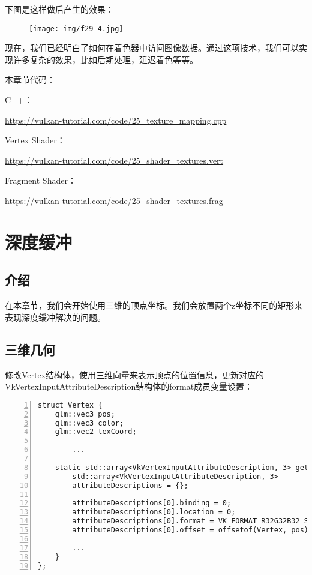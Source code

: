 \documentclass{ctexart}
\begin{document}
下图是这样做后产生的效果：

\begin{figure}[H]
	\centering
	\texttt{[image: img/f29-4.jpg]}
\end{figure}

现在，我们已经明白了如何在着色器中访问图像数据。通过这项技术，我们可以实现许多复杂的效果，比如后期处理，延迟着色等等。

本章节代码：

C++：

\url{https://vulkan-tutorial.com/code/25_texture_mapping.cpp}

Vertex Shader：

\url{https://vulkan-tutorial.com/code/25_shader_textures.vert}

Fragment Shader：

\url{https://vulkan-tutorial.com/code/25_shader_textures.frag}

\newpage
\section{深度缓冲}

\subsection{介绍}

在本章节，我们会开始使用三维的顶点坐标。我们会放置两个z坐标不同的矩形来表现深度缓冲解决的问题。

\subsection{三维几何}

修改Vertex结构体，使用三维向量来表示顶点的位置信息，更新对应的VkVertexInputAttributeDescription结构体的format成员变量设置：

\begin{lstlisting}[language={[ANSI]C},keywordstyle=\color{blue!70},commentstyle=\color{red!50!green!50!blue!50},frame=shadowbox, rulesepcolor=\color{red!20!green!20!blue!20},basicstyle=\small,numbers=left, numberstyle=\tiny,breaklines=true]
struct Vertex {
	glm::vec3 pos;
	glm::vec3 color;
	glm::vec2 texCoord;

		...

	static std::array<VkVertexInputAttributeDescription, 3> getAttributeDescriptions() {
		std::array<VkVertexInputAttributeDescription, 3>
		attributeDescriptions = {};

		attributeDescriptions[0].binding = 0;
		attributeDescriptions[0].location = 0;
		attributeDescriptions[0].format = VK_FORMAT_R32G32B32_SFLOAT;
		attributeDescriptions[0].offset = offsetof(Vertex, pos);

		...
	}
};
\end{lstlisting}
\end{document}
